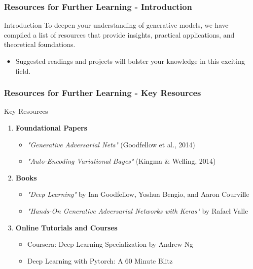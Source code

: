 \documentclass[aspectratio=169]{beamer}
\begin{document}
\begin{frame}
    \frametitle{Resources for Further Learning - Introduction}
    \begin{block}{Introduction}
        To deepen your understanding of generative models, we have compiled a list of resources that provide insights, practical applications, and theoretical foundations. 
        \begin{itemize}
            \item Suggested readings and projects will bolster your knowledge in this exciting field.
        \end{itemize}
    \end{block}
\end{frame}

\begin{frame}
    \frametitle{Resources for Further Learning - Key Resources}
    \begin{block}{Key Resources}
        \begin{enumerate}
            \item \textbf{Foundational Papers}
            \begin{itemize}
                \item \textit{"Generative Adversarial Nets"} (Goodfellow et al., 2014)
                \item \textit{"Auto-Encoding Variational Bayes"} (Kingma \& Welling, 2014)
            \end{itemize}
            
            \item \textbf{Books}
            \begin{itemize}
                \item \textit{"Deep Learning"} by Ian Goodfellow, Yoshua Bengio, and Aaron Courville
                \item \textit{"Hands-On Generative Adversarial Networks with Keras"} by Rafael Valle
            \end{itemize}
            
            \item \textbf{Online Tutorials and Courses}
            \begin{itemize}
                \item Coursera: Deep Learning Specialization by Andrew Ng
                \item Deep Learning with Pytorch: A 60 Minute Blitz
            \end{itemize}
            

\end{enumerate}
\end{block}
\end{frame}
\end{document}
